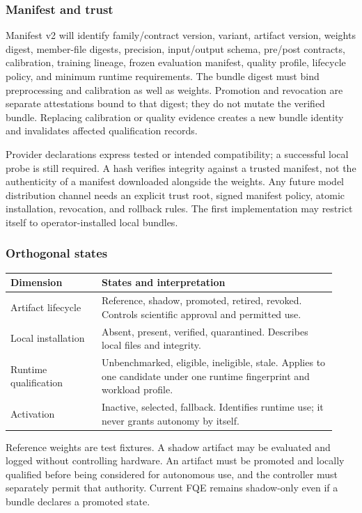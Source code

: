 \documentclass[11pt,a4paper]{article}
\begin{document}
\subsubsection{Manifest and trust}
Manifest v2 will identify family/contract version, variant, artifact version,
weights digest, member-file digests, precision, input/output schema, pre/post
contracts, calibration, training lineage, frozen evaluation manifest, quality
profile, lifecycle policy, and minimum runtime requirements. The bundle digest
must bind preprocessing and calibration as well as weights. Promotion and
revocation are separate attestations bound to that digest; they do not mutate
the verified bundle. Replacing calibration or quality evidence creates a new
bundle identity and invalidates affected qualification records.

Provider declarations express tested or intended compatibility; a successful
local probe is still required. A hash verifies integrity against a trusted
manifest, not the authenticity of a manifest downloaded alongside the weights.
Any future model distribution channel needs an explicit trust root, signed
manifest policy, atomic installation, revocation, and rollback rules. The first
implementation may restrict itself to operator-installed local bundles.

\subsubsection{Orthogonal states}
\begin{longtable}{@{}L{0.26\linewidth}L{0.67\linewidth}@{}}
\toprule Dimension & States and interpretation\\\midrule\endhead
Artifact lifecycle & Reference, shadow, promoted, retired, revoked. Controls
scientific approval and permitted use.\\
Local installation & Absent, present, verified, quarantined. Describes local
files and integrity.\\
Runtime qualification & Unbenchmarked, eligible, ineligible, stale. Applies to
one candidate under one runtime fingerprint and workload profile.\\
Activation & Inactive, selected, fallback. Identifies runtime use; it never
grants autonomy by itself.\\
\bottomrule
\end{longtable}
Reference weights are test fixtures. A shadow artifact may be evaluated and
logged without controlling hardware. An artifact must be promoted and locally
qualified before being considered for autonomous use, and the controller must
separately permit that authority. Current FQE remains shadow-only even if a
bundle declares a promoted state.
\end{document}
